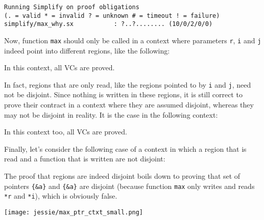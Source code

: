 \documentclass[a4paper,11pt,twoside,openright]{report}
\begin{document}
\begin{verbatim}
Running Simplify on proof obligations
(. = valid * = invalid ? = unknown # = timeout ! = failure)
simplify/max_why.sx           : ?..?........ (10/0/2/0/0)
\end{verbatim}

Now, function \verb|max| should only be called in a context where
parameters \verb|r|, \verb|i| and \verb|j| indeed point into
different regions, like the following:



In this context, all VCs are proved.

In fact, regions that are only read, like the regions pointed to by
\verb|i| and \verb|j|, need not be disjoint. Since nothing is written
in these regions, it is still correct to prove their contract in a
context where they are assumed disjoint, whereas they may not be
disjoint in reality. It is the case in the following context:



In this context too, all VCs are proved.

Finally, let's consider the following case of a context in which a
region that is read and a function that is written are not disjoint:



The proof that regions are indeed disjoint boils down to proving that
set of pointers \verb|{&a}| and \verb|{&a}| are disjoint (because
function \verb|max| only writes and reads \verb|*r| and \verb|*i|),
which is obviously false.

\begin{center}
  \texttt{[image: jessie/max\_ptr\_ctxt\_small.png]}
\end{center}



% 
\end{document}
